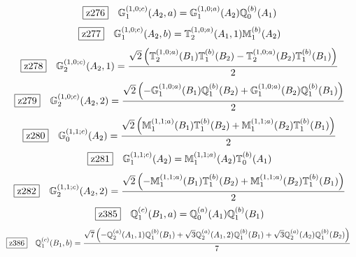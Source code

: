 \documentclass[fleqn,10pt,landscape]{jsarticle}
\begin{document}
\begin{dmath*}
\hspace*{3mm}\fbox{z276}\quad \mathbb{G}_{1}^{(1,0;c)}(A_{2},a)=\mathbb{G}_{1}^{(1,0;a)}(A_{2}) \mathbb{Q}_{0}^{(b)}(A_{1})
\end{dmath*}
\begin{dmath*}
\hspace*{3mm}\fbox{z277}\quad \mathbb{G}_{1}^{(1,0;c)}(A_{2},b)=\mathbb{T}_{2}^{(1,0;a)}(A_{1},1) \mathbb{M}_{1}^{(b)}(A_{2})
\end{dmath*}
\begin{dmath*}
\hspace*{3mm}\fbox{z278}\quad \mathbb{G}_{2}^{(1,0;c)}(A_{2},1)=\frac{\sqrt{2} \left(\mathbb{T}_{2}^{(1,0;a)}(B_{1}) \mathbb{T}_{1}^{(b)}(B_{2}) - \mathbb{T}_{2}^{(1,0;a)}(B_{2}) \mathbb{T}_{1}^{(b)}(B_{1})\right)}{2}
\end{dmath*}
\begin{dmath*}
\hspace*{3mm}\fbox{z279}\quad \mathbb{G}_{2}^{(1,0;c)}(A_{2},2)=\frac{\sqrt{2} \left(- \mathbb{G}_{1}^{(1,0;a)}(B_{1}) \mathbb{Q}_{1}^{(b)}(B_{2}) + \mathbb{G}_{1}^{(1,0;a)}(B_{2}) \mathbb{Q}_{1}^{(b)}(B_{1})\right)}{2}
\end{dmath*}
\begin{dmath*}
\hspace*{3mm}\fbox{z280}\quad \mathbb{G}_{0}^{(1,1;c)}(A_{2})=\frac{\sqrt{2} \left(\mathbb{M}_{1}^{(1,1;a)}(B_{1}) \mathbb{T}_{1}^{(b)}(B_{2}) + \mathbb{M}_{1}^{(1,1;a)}(B_{2}) \mathbb{T}_{1}^{(b)}(B_{1})\right)}{2}
\end{dmath*}
\begin{dmath*}
\hspace*{3mm}\fbox{z281}\quad \mathbb{G}_{1}^{(1,1;c)}(A_{2})=\mathbb{M}_{1}^{(1,1;a)}(A_{2}) \mathbb{T}_{0}^{(b)}(A_{1})
\end{dmath*}
\begin{dmath*}
\hspace*{3mm}\fbox{z282}\quad \mathbb{G}_{2}^{(1,1;c)}(A_{2},2)=\frac{\sqrt{2} \left(- \mathbb{M}_{1}^{(1,1;a)}(B_{1}) \mathbb{T}_{1}^{(b)}(B_{2}) + \mathbb{M}_{1}^{(1,1;a)}(B_{2}) \mathbb{T}_{1}^{(b)}(B_{1})\right)}{2}
\end{dmath*}
\begin{dmath*}
\hspace*{3mm}\fbox{z385}\quad \mathbb{Q}_{1}^{(c)}(B_{1},a)=\mathbb{Q}_{0}^{(a)}(A_{1}) \mathbb{Q}_{1}^{(b)}(B_{1})
\end{dmath*}
\begin{dmath*}
\hspace*{3mm}\fbox{z386}\quad \mathbb{Q}_{1}^{(c)}(B_{1},b)=\frac{\sqrt{7} \left(- \mathbb{Q}_{2}^{(a)}(A_{1},1) \mathbb{Q}_{1}^{(b)}(B_{1}) + \sqrt{3} \mathbb{Q}_{2}^{(a)}(A_{1},2) \mathbb{Q}_{1}^{(b)}(B_{1}) + \sqrt{3} \mathbb{Q}_{2}^{(a)}(A_{2}) \mathbb{Q}_{1}^{(b)}(B_{2})\right)}{7}
\end{dmath*}
\end{document}
